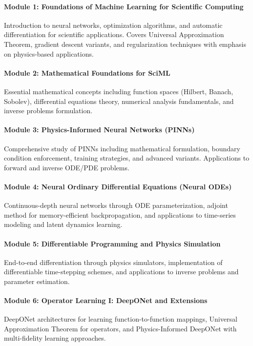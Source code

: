 \documentclass[11pt,fourier]{article}
\begin{document}
	\paragraph{Module 1: Foundations of Machine Learning for Scientific Computing}
	Introduction to neural networks, optimization algorithms, and automatic differentiation for scientific applications. Covers Universal Approximation Theorem, gradient descent variants, and regularization techniques with emphasis on physics-based applications.
	
	\paragraph{Module 2: Mathematical Foundations for SciML}
	Essential mathematical concepts including function spaces (Hilbert, Banach, Sobolev), differential equations theory, numerical analysis fundamentals, and inverse problems formulation.
	
	\paragraph{Module 3: Physics-Informed Neural Networks (PINNs)}
	Comprehensive study of PINNs including mathematical formulation, boundary condition enforcement, training strategies, and advanced variants. Applications to forward and inverse ODE/PDE problems.
	
	\paragraph{Module 4: Neural Ordinary Differential Equations (Neural ODEs)}
	Continuous-depth neural networks through ODE parameterization, adjoint method for memory-efficient backpropagation, and applications to time-series modeling and latent dynamics learning.
	
	\paragraph{Module 5: Differentiable Programming and Physics Simulation}
	End-to-end differentiation through physics simulators, implementation of differentiable time-stepping schemes, and applications to inverse problems and parameter estimation.
	
	\paragraph{Module 6: Operator Learning I: DeepONet and Extensions}
	DeepONet architectures for learning function-to-function mappings, Universal Approximation Theorem for operators, and Physics-Informed DeepONet with multi-fidelity learning approaches.
	
\end{document}
